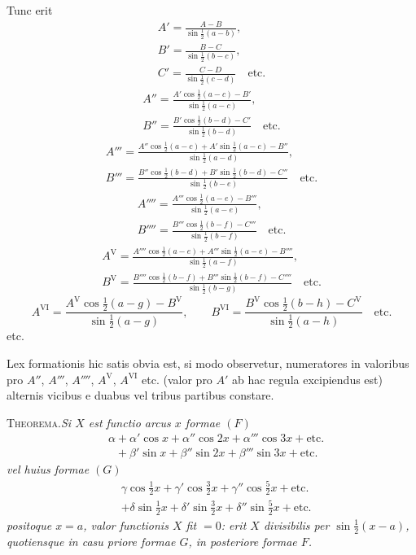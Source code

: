Tunc erit
\[\begin{gathered}
A'=\frac{A-B}{\sin\tfrac12(a-b)},\\[5pt]
B'=\frac{B-C}{\sin\tfrac12(b-c)},\\[5pt]
C'=\frac{C-D}{\sin\tfrac12(c-d)}\quad\text{etc.}
\end{gathered}\]
\[\begin{gathered}
A''=\frac{A'\cos\tfrac12(a-c)-B'}{\sin\tfrac12(a-c)},\\[5pt]
B''=\frac{B'\cos\tfrac12(b-d)-C'}{\sin\tfrac12(b-d)}\quad\text{etc.}
\end{gathered}\]
\[\begin{gathered}
A'''=\frac{A''\cos\tfrac12(a-c)+A'\sin\tfrac12(a-c)-B''}{\sin\tfrac12(a-d)},\\[5pt]
B'''=\frac{B''\cos\tfrac12(b-d)+B'\sin\tfrac12(b-d)-C''}{\sin\tfrac12(b-e)}\quad\text{etc.}
\end{gathered}\]
\[\begin{gathered}
A''''=\frac{A'''\cos\tfrac12(a-e)-B'''}{\sin\tfrac12(a-e)},\\[5pt]
B''''=\frac{B'''\cos\tfrac12(b-f)-C'''}{\sin\tfrac12(b-f)}\quad\text{etc.}
\end{gathered}\]
\[\begin{gathered}
A^{\mathrm{V}}=\frac{A''''\cos\tfrac12(a-e)+A'''\sin\tfrac12(a-e)-B''''}{\sin\tfrac12(a-f)},\\[5pt]
B^{\mathrm{V}}=\frac{B''''\cos\tfrac12(b-f)+B'''\sin\tfrac12(b-f)-C''''}{\sin\tfrac12(b-g)}\quad\text{etc.}
\end{gathered}\]
\[
A^{\mathrm{VI}}=\frac{A^{\mathrm{V}}\cos\tfrac12(a-g)-B^{\mathrm{V}}}{\sin\tfrac12(a-g)},\qquad
B^{\mathrm{VI}}=\frac{B^{\mathrm{V}}\cos\tfrac12(b-h)-C^{\mathrm{V}}}{\sin\tfrac12(a-h)}\quad\text{etc.}
\]
etc.

Lex formationis hic satis obvia est, si modo observetur, numeratores in valoribus pro $A''$, $A'''$, $A''''$, $A^{\mathrm{V}}$, $A^{\mathrm{VI}}$ etc. (valor pro $A'$ ab hac regula excipiendus est) alternis vicibus e duabus vel tribus partibus constare.

\textsc{Theorema.}\quad\textit{Si $X$ est functio arcus $x$ formae $(F)$}
\[
\begin{aligned}
&\alpha+\alpha'\cos x+\alpha''\cos 2x+\alpha'''\cos 3x+\text{etc.}\\[5pt]
&\phantom{\alpha}+\beta'\sin x+\beta''\sin 2x+\beta'''\sin 3x+\text{etc.}
\end{aligned}
\]
\textit{vel huius formae $(G)$}
\[
\begin{aligned}
&\gamma\cos\tfrac12x+\gamma'\cos\tfrac32x+\gamma''\cos\tfrac52x+\text{etc.}\\[5pt]
&+\delta\sin\tfrac12x+\delta'\sin\tfrac32x+\delta''\sin\tfrac52x+\text{etc.}
\end{aligned}
\]
\textit{positoque $x=a$, valor functionis $X$ fit $=0$: erit $X$ divisibilis per $\sin\tfrac12(x-a)$, quotiensque in casu priore formae $G$, in posteriore formae $F$.}

